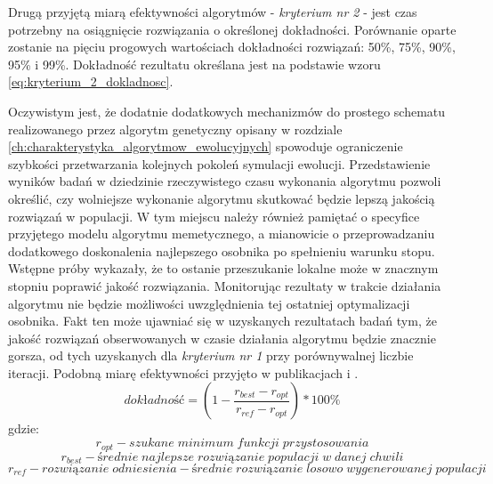\par
Drugą przyjętą miarą efektywności algorytmów - \emph{kryterium nr 2} - jest czas potrzebny na osiągnięcie rozwiązania o określonej dokładności. Porównanie oparte zostanie na pięciu progowych wartościach dokładności rozwiązań: 50\%, 75\%, 90\%, 95\% i 99\%. Dokładność rezultatu określana jest na podstawie wzoru \ref{eq:kryterium_2_dokladnosc}. 
\par
Oczywistym jest, że dodatnie dodatkowych mechanizmów do prostego schematu realizowanego przez algorytm genetyczny opisany w rozdziale \ref{ch:charakterystyka_algorytmow_ewolucyjnych} spowoduje ograniczenie szybkości przetwarzania kolejnych pokoleń symulacji ewolucji. Przedstawienie wyników badań w dziedzinie rzeczywistego czasu wykonania algorytmu pozwoli określić, czy wolniejsze wykonanie algorytmu skutkować będzie lepszą jakością rozwiązań w populacji. W tym miejscu należy również pamiętać o specyfice przyjętego modelu algorytmu memetycznego, a mianowicie o przeprowadzaniu dodatkowego doskonalenia najlepszego osobnika po spełnieniu warunku stopu. Wstępne próby wykazały, że to ostanie przeszukanie lokalne może w znacznym stopniu poprawić jakość rozwiązania. Monitorując rezultaty w trakcie działania algorytmu nie będzie możliwości uwzględnienia tej ostatniej optymalizacji osobnika. Fakt ten może ujawniać się w uzyskanych rezultatach badań tym, że jakość rozwiązań obserwowanych w czasie działania algorytmu będzie znacznie gorsza, od tych uzyskanych dla \emph{kryterium nr 1} przy porównywalnej liczbie iteracji. Podobną miarę efektywności przyjęto w publikacjach \cite{elbeltagi2005comparison} i \cite{mullen2014continuous}.
\begin{equation} \label{eq:kryterium_2_dokladnosc}
dokładność = \left(1-\frac{r_{best}-r_{opt}}{r_{ref}-r_{opt}}\right)*100\%
\end{equation}
gdzie:
\[r_{opt} - szukane\; minimum\; funkcji\; przystosowania\]
\[r_{best} - średnie\; najlepsze\; rozwiązanie\; populacji\; w\; danej\; chwili\]
\[r_{ref} - rozwiązanie\; odniesienia - średnie\; rozwiązanie\; losowo\; wygenerowanej\; populacji\]


